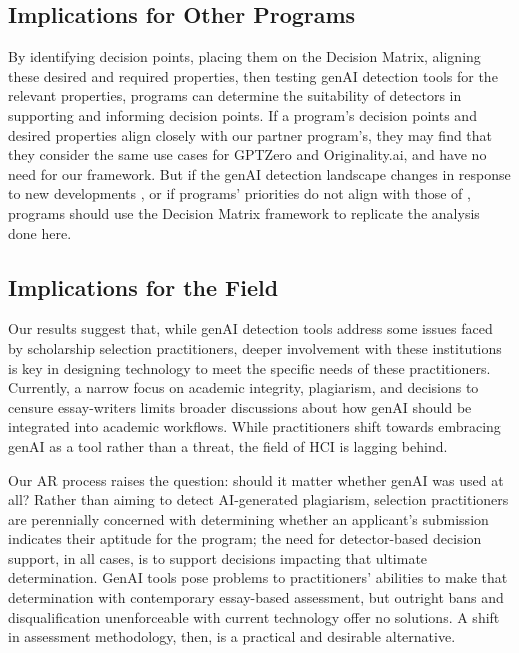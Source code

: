 \subsection{Implications for Other Programs}
By identifying decision points, placing them on the Decision Matrix, aligning these desired and required properties, then testing genAI detection tools for the relevant properties, programs can determine the suitability of detectors in supporting and informing decision points. If a program's decision points and desired properties align closely with our partner program's, they may find that they consider the same use cases for GPTZero and Originality.ai, and have no need for our framework. But if the genAI detection landscape changes in response to new developments \cite{ashish_vaswani_attention_2017,jacob_devlin_bert_2018,openai_gpt-4_2023,liang_gpt_2023,mitchell_detectgpt_2023,liu_deid-gpt_2023,kalpesh_krishna_paraphrasing_2023}, or if programs' priorities do not align with those of \rise, programs should use the Decision Matrix framework to replicate the analysis done here.

\subsection{Implications for the Field}
Our results suggest that, while genAI detection tools address some issues faced by scholarship selection practitioners, deeper involvement with these institutions is key in designing technology to meet the specific needs of these practitioners. Currently, a narrow focus on academic integrity, plagiarism, and decisions to censure essay-writers limits broader discussions about how genAI should be integrated into academic workflows. While practitioners shift towards embracing genAI as a tool rather than a threat, the field of HCI is lagging behind. 

Our AR process raises the question: should it matter whether genAI was used at all? Rather than aiming to detect AI-generated plagiarism, selection practitioners are perennially concerned with determining whether an applicant's submission indicates their aptitude for the program; the need for detector-based decision support, in all cases, is to support decisions impacting that ultimate determination. GenAI tools pose problems to practitioners' abilities to make that determination with contemporary essay-based assessment, but outright bans and disqualification \cite{h_holden_thorp_chatgpt_2023} unenforceable with current technology offer no solutions. A shift in assessment methodology, then, is a practical and desirable alternative.

